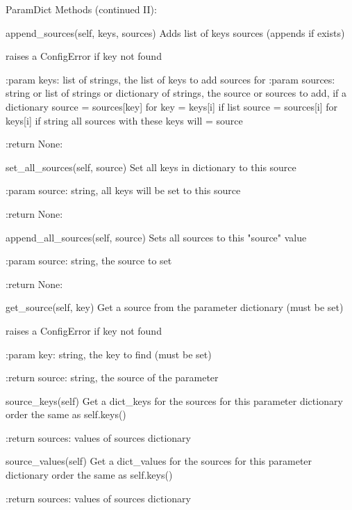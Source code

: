 \begin{minipage}{\textwidth}
\begin{pythondocstring}
ParamDict Methods (continued II):

	append_sources(self, keys, sources)
	        Adds list of keys sources (appends if exists)

	        raises a ConfigError if key not found

	        :param keys: list of strings, the list of keys to add sources for
	        :param sources: string or list of strings or dictionary of strings,
	                        the source or sources to add,
	                        if a dictionary source = sources[key] for key = keys[i]
	                        if list source = sources[i]  for keys[i]
	                        if string all sources with these keys will = source

	        :return None:

	set_all_sources(self, source)
	        Set all keys in dictionary to this source

	        :param source: string, all keys will be set to this source

	        :return None:

	append_all_sources(self, source)
	        Sets all sources to this "source" value

	        :param source: string, the source to set

	        :return None:

	get_source(self, key)
	        Get a source from the parameter dictionary (must be set)

	        raises a ConfigError if key not found

	        :param key: string, the key to find (must be set)

	        :return source: string, the source of the parameter

	source_keys(self)
	        Get a dict_keys for the sources for this parameter dictionary
	        order the same as self.keys()

	        :return sources: values of sources dictionary

	source_values(self)
	        Get a dict_values for the sources for this parameter dictionary
	        order the same as self.keys()

	        :return sources: values of sources dictionary
\end{pythondocstring}
\end{minipage}


